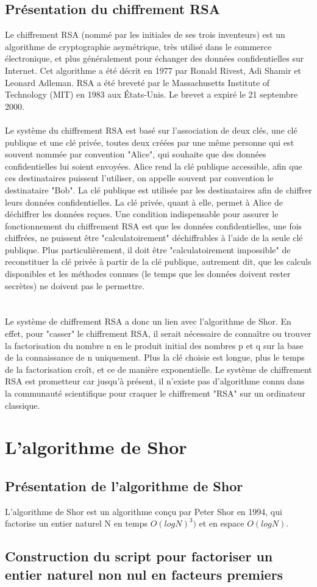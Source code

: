 \documentclass[12pt]{article}
\begin{document}
\subsection{Présentation du chiffrement RSA}
Le chiffrement RSA (nommé par les initiales de ses trois inventeurs) est un algorithme de cryptographie asymétrique, très utilisé dans le commerce électronique, et plus généralement pour échanger des données confidentielles sur Internet. Cet algorithme a été décrit en 1977 par Ronald Rivest, Adi Shamir et Leonard Adleman. RSA a été breveté par le Massachusetts Institute of Technology (MIT) en 1983 aux États-Unis. Le brevet a expiré le 21 septembre 2000.
\\
\\
Le système du chiffrement RSA est basé sur l'association de deux clés, une clé publique et une clé privée, toutes deux créées par une même personne qui est souvent nommée par convention "Alice", qui souhaite que des données confidentielles lui soient envoyées. Alice rend la clé publique accessible, afin que ces destinataires puissent l'utiliser, on appelle souvent par convention le destinataire "Bob". La clé publique est utilisée par les destinataires afin de chiffrer leurs données confidentielles. La clé privée, quant à elle, permet à Alice de déchiffrer les données reçues.
Une condition indispensable pour assurer le fonctionnement du chiffrement RSA est que les données confidentielles, une fois chiffrées, ne puissent être "calculatoirement" déchiffrables à l'aide de la seule clé publique. Plus particulièrement, il doit être "calculatoirement impossible" de reconstituer la clé privée à partir de la clé publique, autrement dit, que les calculs disponibles et les méthodes connues (le temps que les données doivent rester secrètes) ne doivent pas le permettre.
\\
\\
\\
Le système de chiffrement RSA a donc un lien avec l'algorithme de Shor. En effet, pour "casser" le chiffrement RSA, il serait nécessaire de connaître ou trouver la factorisation du nombre n en le produit initial des nombres p et q sur la base de la connaissance de n uniquement. Plus la clé choisie est longue, plus le temps de la factorisation croît, et ce de manière exponentielle. Le système de chiffrement RSA est prometteur car jusqu'à présent, il n'existe pas d'algorithme connu dans la communauté scientifique pour craquer le chiffrement "RSA" sur un ordinateur classique.
\section{L'algorithme de Shor}
\subsection{Présentation de l'algorithme de Shor}
L'algorithme de Shor est un algorithme conçu par Peter Shor en 1994, qui factorise un entier naturel N en temps $O(log N)^3)$ et en espace $O(log N)$.

\subsection{Construction du script pour factoriser un entier naturel non nul en facteurs premiers}
\end{document}

